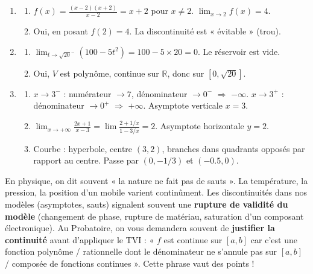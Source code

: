 \documentclass[11pt]{article}
\begin{document}
\begin{corrige}
\begin{enumerate}
\item \begin{enumerate}
  \item $f(x) = \frac{(x-2)(x+2)}{x-2} = x+2$ pour $x \neq 2$. $\lim_{x \to 2} f(x) = 4$.
  \item Oui, en posant $f(2) = 4$. La discontinuité est « évitable » (trou).
  \end{enumerate}
\item \begin{enumerate}
  \item $\lim_{t \to \sqrt{20}^{-}} (100 - 5t^2) = 100 - 5 \times 20 = 0$. Le réservoir est vide.
  \item Oui, $V$ est polynôme, continue sur $\mathbb{R}$, donc sur $[0, \sqrt{20}]$.
  \end{enumerate}
\item \begin{enumerate}
  \item $x \to 3^{-}$ : numérateur $\to 7$, dénominateur $\to 0^{-}$ $\Rightarrow$ $-\infty$.
  $x \to 3^{+}$ : dénominateur $\to 0^{+}$ $\Rightarrow$ $+\infty$. Asymptote verticale $x=3$.
  \item $\lim_{x \to +\infty} \frac{2x+1}{x-3} = \lim \frac{2+1/x}{1-3/x} = 2$. Asymptote horizontale $y=2$.
  \item Courbe : hyperbole, centre $(3,2)$, branches dans quadrants opposés par rapport au centre. Passe par $(0, -1/3)$ et $(-0.5, 0)$.
  \end{enumerate}
\end{enumerate}
\end{corrige}

\begin{savaistu}
En physique, on dit souvent « la nature ne fait pas de sauts ». La température, la pression, la position d'un mobile varient continûment. Les discontinuités dans nos modèles (asymptotes, sauts) signalent souvent une \textbf{rupture de validité du modèle} (changement de phase, rupture de matériau, saturation d'un composant électronique). Au Probatoire, on vous demandera souvent de \textbf{justifier la continuité} avant d'appliquer le TVI : « $f$ est continue sur $[a,b]$ car c'est une fonction polynôme / rationnelle dont le dénominateur ne s'annule pas sur $[a,b]$ / composée de fonctions continues ». Cette phrase vaut des points !
\end{savaistu}
\end{document}
